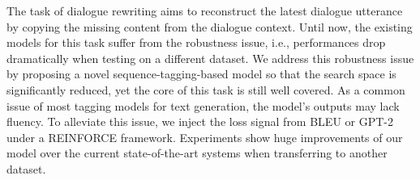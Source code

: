 The task of dialogue rewriting aims to reconstruct the latest dialogue utterance by copying the missing content from the dialogue context. Until now, the existing models for this task suffer from the robustness issue, i.e., performances drop dramatically when testing on a different dataset. We address this robustness issue by proposing a novel sequence-tagging-based model so that the search space is significantly reduced, yet the core of this task is still well covered. As a common issue of most tagging models for text generation, the model's outputs may lack fluency. To alleviate this issue, we inject the loss signal from BLEU or GPT-2 under a REINFORCE framework. Experiments show huge improvements of our model over the current state-of-the-art systems when transferring to another dataset.
